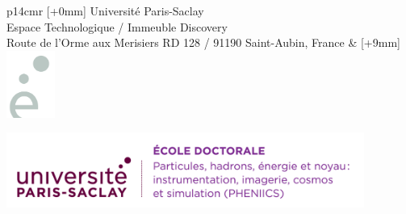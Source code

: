 \vspace{7cm} %
\selectfont
\begin{tabular}{p{14cm}r}
	[+0mm]{{\color{Prune} Université Paris-Saclay\\
			Espace Technologique / Immeuble Discovery\\
			Route de l’Orme aux Merisiers RD 128 / 91190 Saint-Aubin, France}} & [+9mm]{\includegraphics[height=2.19cm]{e.png}}\\
\end{tabular}



\newpage


\noindent 
\includegraphics[height=2.45cm]{EDpic}
\vspace{1cm}


